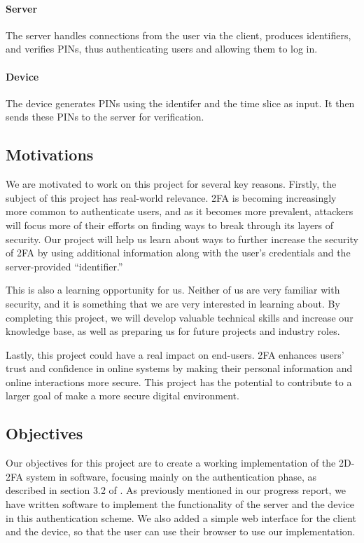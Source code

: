 \documentclass[11pt]{article}
\begin{document}
\paragraph{Server} The server handles connections from the user via the
client, produces identifiers, and verifies PINs, thus authenticating
users and allowing them to log in.

\paragraph{Device} The device generates PINs using the identifer and the
time slice as input. It then sends these PINs to the server for
verification. 

\subsection{Motivations}

We are motivated to work on this project for several key reasons.
Firstly, the subject of this project has real-world relevance. 2FA is
becoming increasingly more common to authenticate users, and as it
becomes more prevalent, attackers will focus more of their efforts on
finding ways to break through its layers of security. Our project will
help us learn about ways to further increase the security of 2FA by
using additional information along with the user's credentials and the
server-provided ``identifier.''

This is also a learning opportunity for us. Neither of us are very
familiar with security, and it is something that we are very interested
in learning about. By completing this project, we will develop valuable
technical skills and increase our knowledge base, as well as preparing
us for future projects and industry roles.

Lastly, this project could have a real impact on end-users. 2FA enhances
users' trust and confidence in online systems by making their personal
information and online interactions more secure. This project has the
potential to contribute to a larger goal of make a more secure digital
environment. 

\subsection{Objectives}

Our objectives for this project are to create a working implementation
of the 2D-2FA system in software, focusing mainly on the authentication
phase, as described in section 3.2 of \cite{shirvanian2d2fa}. As
previously mentioned in our progress report, we have written software to
implement the functionality of the server and the device in this
authentication scheme. We also added a simple web interface for the
client and the device, so that the user can use their browser to use our
implementation. 
\end{document}
